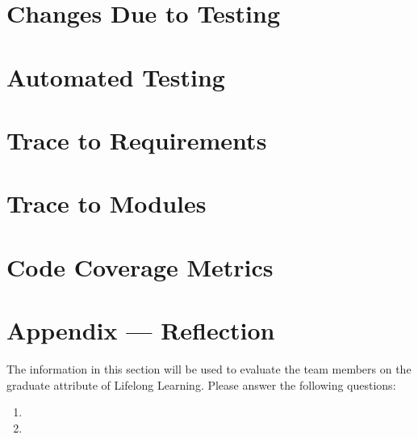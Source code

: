 \documentclass[12pt, titlepage]{article}
\begin{document}
\section{Changes Due to Testing}

\section{Automated Testing}
		
\section{Trace to Requirements}
		
\section{Trace to Modules}		

\section{Code Coverage Metrics}




\newpage{}
\section*{Appendix --- Reflection}

The information in this section will be used to evaluate the team members on the
graduate attribute of Lifelong Learning.  Please answer the following questions:

\begin{enumerate}
  \item 
  \item 
\end{enumerate}
\end{document}
